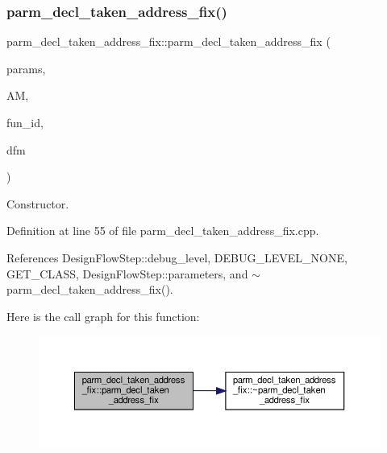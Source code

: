 \subsubsection{\texorpdfstring{parm\+\_\+decl\+\_\+taken\+\_\+address\+\_\+fix()}{parm\_decl\_taken\_address\_fix()}}
{\footnotesize\ttfamily parm\+\_\+decl\+\_\+taken\+\_\+address\+\_\+fix\+::parm\+\_\+decl\+\_\+taken\+\_\+address\+\_\+fix (\begin{DoxyParamCaption}\item[{const \hyperlink{Parameter_8hpp_a37841774a6fcb479b597fdf8955eb4ea}{Parameter\+Const\+Ref}}]{params,  }\item[{const \hyperlink{application__manager_8hpp_a04ccad4e5ee401e8934306672082c180}{application\+\_\+manager\+Ref}}]{AM,  }\item[{unsigned int}]{fun\+\_\+id,  }\item[{const Design\+Flow\+Manager\+Const\+Ref}]{dfm }\end{DoxyParamCaption})}



Constructor. 



Definition at line 55 of file parm\+\_\+decl\+\_\+taken\+\_\+address\+\_\+fix.\+cpp.



References Design\+Flow\+Step\+::debug\+\_\+level, D\+E\+B\+U\+G\+\_\+\+L\+E\+V\+E\+L\+\_\+\+N\+O\+NE, G\+E\+T\+\_\+\+C\+L\+A\+SS, Design\+Flow\+Step\+::parameters, and $\sim$parm\+\_\+decl\+\_\+taken\+\_\+address\+\_\+fix().

Here is the call graph for this function\+:
\nopagebreak
\begin{figure}[H]
\begin{center}
\leavevmode
\includegraphics[width=350pt]{dc/dfd/classparm__decl__taken__address__fix_aa1e7ca2ebe935f87fc9f2019544cce88_cgraph}
\end{center}
\end{figure}
\mbox{\label{classparm__decl__taken__address__fix_a3a432417ede404ca05b53522759ca99a}} 
